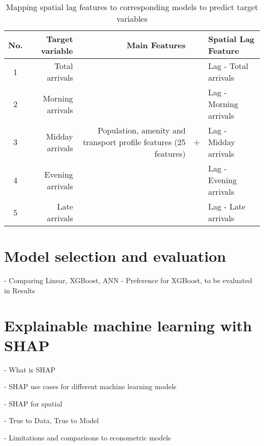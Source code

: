 \begin{table}[ht]
    \centering
    \renewcommand{\arraystretch}{1.5}
    \begin{tabular}{|c r || r c l|}
        \hline
        \rowcolor{lightgray}
        \textbf{No.} & \textbf{Target variable} & \textbf{Main Features} & &\textbf{Spatial Lag Feature}\\
        
        \hline
        1 & Total arrivals  &  \multirow{5}{12em}{Population, amenity and transport profile features (25 features)} 
                                &  \multirow{5}{*}{+}       &   Lag - Total arrivals    \\ 
        2 & Morning arrivals    &                       &   &   Lag - Morning arrivals  \\ 
        3 & Midday arrivals     &                       &   &   Lag - Midday arrivals   \\ 
        4 & Evening arrivals    &                       &   &   Lag - Evening arrivals  \\ 
        5 & Late arrivals       &                       &   &   Lag - Late arrivals     \\
        \hline
    \end{tabular}
    \caption{Mapping spatial lag features to corresponding models to predict target variables}
    \label{tab:spatiallag}
\end{table}



\pagebreak[4] %
\section{Model selection and evaluation}
- Comparing Linear, XGBoost, ANN
- Preference for XGBoost, to be evaluated in Results
\section{Explainable machine learning with SHAP}
 - What is SHAP 
 
 - SHAP use cases for different machine learning models

 - SHAP for spatial

 - True to Data, True to Model

 - Limitations and comparisons to econometric models
